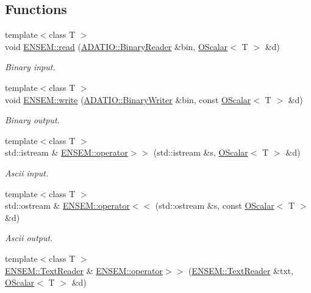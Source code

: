 \subsection*{Functions}
\begin{DoxyCompactItemize}
\item 
{\footnotesize template$<$class T $>$ }\\void \mbox{\hyperlink{group__obsscalar_ga5b22786975bbf72d834fd044913a417b}{E\+N\+S\+E\+M\+::read}} (\mbox{\hyperlink{classADATIO_1_1BinaryReader}{A\+D\+A\+T\+I\+O\+::\+Binary\+Reader}} \&bin, \mbox{\hyperlink{classENSEM_1_1OScalar}{O\+Scalar}}$<$ T $>$ \&d)
\begin{DoxyCompactList}\small\item\em Binary input. \end{DoxyCompactList}\item 
{\footnotesize template$<$class T $>$ }\\void \mbox{\hyperlink{group__obsscalar_ga921d40c8afba8e09044b5c679c71b495}{E\+N\+S\+E\+M\+::write}} (\mbox{\hyperlink{classADATIO_1_1BinaryWriter}{A\+D\+A\+T\+I\+O\+::\+Binary\+Writer}} \&bin, const \mbox{\hyperlink{classENSEM_1_1OScalar}{O\+Scalar}}$<$ T $>$ \&d)
\begin{DoxyCompactList}\small\item\em Binary output. \end{DoxyCompactList}\item 
{\footnotesize template$<$class T $>$ }\\std\+::istream \& \mbox{\hyperlink{group__obsscalar_ga8ceaf63a1afb58830666610d78d86809}{E\+N\+S\+E\+M\+::operator$>$$>$}} (std\+::istream \&s, \mbox{\hyperlink{classENSEM_1_1OScalar}{O\+Scalar}}$<$ T $>$ \&d)
\begin{DoxyCompactList}\small\item\em Ascii input. \end{DoxyCompactList}\item 
{\footnotesize template$<$class T $>$ }\\std\+::ostream \& \mbox{\hyperlink{group__obsscalar_ga7ac0c3b6cd38466c57c199a30f7795cd}{E\+N\+S\+E\+M\+::operator$<$$<$}} (std\+::ostream \&s, const \mbox{\hyperlink{classENSEM_1_1OScalar}{O\+Scalar}}$<$ T $>$ \&d)
\begin{DoxyCompactList}\small\item\em Ascii output. \end{DoxyCompactList}\item 
{\footnotesize template$<$class T $>$ }\\\mbox{\hyperlink{classENSEM_1_1TextReader}{E\+N\+S\+E\+M\+::\+Text\+Reader}} \& \mbox{\hyperlink{group__obsscalar_ga0ec7538d973fc2e40220fd1ef622f982}{E\+N\+S\+E\+M\+::operator$>$$>$}} (\mbox{\hyperlink{classENSEM_1_1TextReader}{E\+N\+S\+E\+M\+::\+Text\+Reader}} \&txt, \mbox{\hyperlink{classENSEM_1_1OScalar}{O\+Scalar}}$<$ T $>$ \&d)

\end{DoxyCompactItemize}
